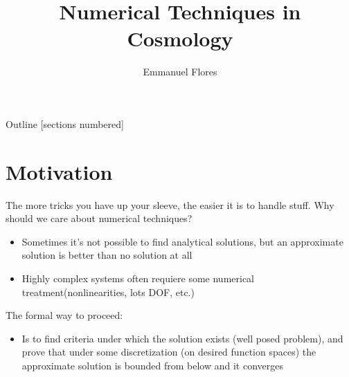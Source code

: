 \documentclass[aspectratio=169, 12pt]{beamer}
\title{Numerical Techniques in Cosmology}
\author{Emmanuel Flores}
\institute{Cosmololgy Final Presentation, \\Tufts University}
\begin{document}
\maketitle	
\begin{frame}{Outline}
	[sections numbered]
	\tableofcontents[currentsection]
\end{frame}
\section{Motivation}
\begin{frame}{The more tricks you have up your sleeve, the easier it is to handle stuff.}
\pause
Why should we care about numerical techniques? 
\pause
\begin{itemize}
	\item Sometimes it's not possible to find analytical solutions, but \alert{an approximate solution is better than no solution at all}\pause
	\item Highly complex systems often requiere some numerical treatment(\alert{nonlinearities, lots DOF, etc.})\pause
\end{itemize}
The formal way to proceed: \pause
\begin{itemize}
	\item Is to find criteria under which the \alert{solution exists} (well posed problem), and prove that under some discretization (on desired function spaces) the approximate solution is \alert{bounded from below and it converges}
\end{itemize}
\end{frame}
\end{document}
